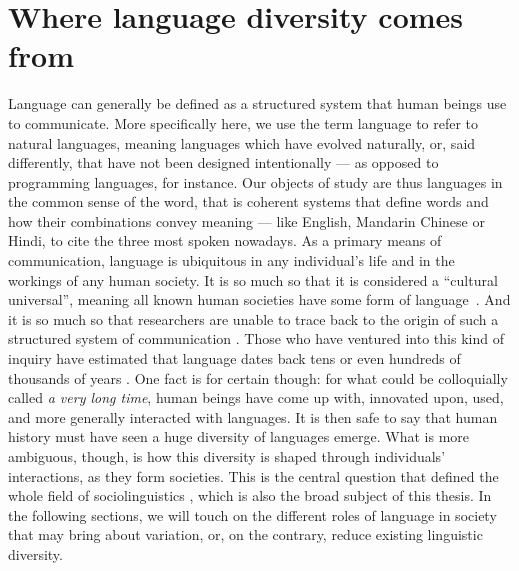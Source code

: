 \documentclass[../thesis.tex]{subfiles}
\begin{document}
\chapter{Where language diversity comes from}
\label{ch:origins_lang_diversity}

Language can generally be defined as
a structured system that human beings use to communicate.
More specifically here, we use the term language to refer to natural languages,
meaning languages which have evolved naturally, or, said differently, that have not been
designed intentionally --- as opposed to programming languages, for instance. Our
objects of study are thus languages in the common sense of the word, that is coherent
systems that define words and how their combinations convey meaning --- like English,
Mandarin Chinese or Hindi, to cite the three most spoken nowadays. As a primary means of
communication, language
is ubiquitous in any individual's life and in the workings of any human society. It is
so much so that it is considered a ``cultural universal'', meaning all known human
societies have some form of
language~\cite{GreenbergLanguageUniversals2020,BrownDonaldHumanUniversals1991,}. And it
is so much so that researchers are unable to trace back to the origin of such a
structured system of communication
\cite{MullerLectureIX1861,StamInquiriesOrigin1976,GibsonOxfordHandbook2011,HauserMysteryLanguage2014}.
Those who have ventured into this kind of inquiry have estimated that language dates
back tens or even hundreds of thousands of years
\cite{NicholsOriginDispersal1998,ChomskyLanguageMind2004,BothaCradleLanguage2009,DediuAntiquityLanguage2013}.
One fact is for certain though: for what could be colloquially called \emph{a very long
time}, human beings have come up with, innovated upon, used, and more generally
interacted with languages. It is then safe to say that human history must have seen a
huge diversity of languages emerge. What is more ambiguous, though, is how this
diversity is shaped through individuals' interactions, as they form societies. This is
the central question that defined the whole field of sociolinguistics
\cite{LabovSociolinguisticPatterns1973,TrudgillSociolinguisticsIntroduction2000,ChambersSociolinguisticTheory2007,WardhaughIntroductionSociolinguistics2008,LabovPrinciplesLinguistic2001},
which is also the broad subject of this thesis. In the following sections, we will touch
on the different roles of language in society that may bring about variation, or, on the
contrary, reduce existing linguistic diversity.
\end{document}
